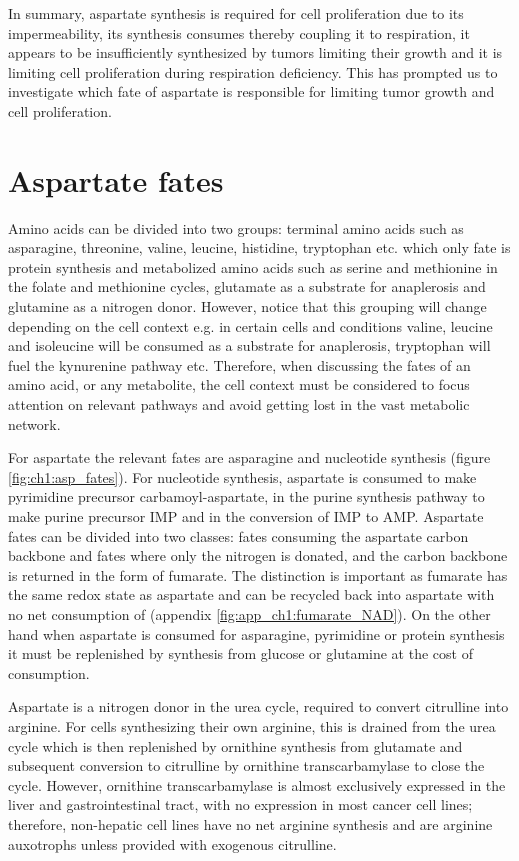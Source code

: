 In summary, aspartate synthesis is required for cell proliferation due to its impermeability, its synthesis consumes \NAD{} thereby coupling it to respiration, it appears to be insufficiently synthesized by tumors limiting their growth and it is limiting cell proliferation during respiration deficiency.
This has prompted us to investigate which fate of aspartate is responsible for limiting tumor growth and cell proliferation.



\section{Aspartate fates}
Amino acids can be divided into two groups: terminal amino acids such as asparagine, threonine, valine, leucine, histidine, tryptophan etc. which only fate is protein synthesis and metabolized amino acids such as serine and methionine in the folate and methionine cycles, glutamate as a substrate for anaplerosis and glutamine as a nitrogen donor.
However, notice that this grouping will change depending on the cell context e.g. in certain cells and conditions valine, leucine and isoleucine will be consumed as a substrate for anaplerosis, tryptophan will fuel the kynurenine pathway etc.
Therefore, when discussing the fates of an amino acid, or any metabolite, the cell context must be considered to focus attention on relevant pathways and avoid getting lost in the vast metabolic network.

For aspartate the relevant fates are asparagine and nucleotide synthesis (figure \ref{fig:ch1:asp_fates}).
For nucleotide synthesis, aspartate is consumed to make pyrimidine precursor carbamoyl-aspartate, in the purine synthesis pathway to make purine precursor IMP and in the conversion of IMP to AMP.
Aspartate fates can be divided into two classes: fates consuming the aspartate carbon backbone and fates where only the nitrogen is donated, and the carbon backbone is returned in the form of fumarate.
The distinction is important as fumarate has the same redox state as aspartate and can be recycled back into aspartate with no net consumption of \NAD (appendix \ref{fig:app_ch1:fumarate_NAD}).
On the other hand when aspartate is consumed for asparagine, pyrimidine or protein synthesis it must be replenished by synthesis from glucose or glutamine at the cost of \NAD{} consumption.

Aspartate is a nitrogen donor in the urea cycle, required to convert citrulline into arginine.
For cells synthesizing their own arginine, this is drained from the urea cycle which is then replenished by ornithine synthesis from glutamate and subsequent conversion to citrulline by ornithine transcarbamylase to close the cycle.
However, ornithine transcarbamylase is almost exclusively expressed in the liver and gastrointestinal tract, with no expression in most cancer cell lines; therefore, non-hepatic cell lines have no net arginine synthesis and are arginine auxotrophs unless provided with exogenous citrulline.

